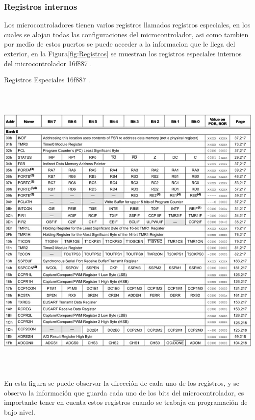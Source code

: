 \documentclass[12pt,a4paper]{article}
\begin{document}
   \subsubsection{Registros internos}
   Los microcontroladores tienen varios registros llamados registros especiales, en los cuales se alojan todas las configuraciones del microcontrolador, asi como tambien por medio de estos puertos se puede acceder a la informacion que le llega del exterior, en la Figura\ref{fig:Registros} se muestran los registros especiales internos del microcontrolador 16f887 \cite{PIC}.
   
   \begin{table}[htpb]
   \centering
   \caption{Registros Especiales 16f887 \cite{PIC}.}
   \includegraphics[height=15cm]{Registros}
   \label{fig:Registros}
   \end{table}
   
   En esta figura se puede observar la dirección de cada uno de los registros, y se observa la información que guarda cada uno de los bits del microcontrolador, es importante tener en cuenta estos registros cuando se trabaja en programación de bajo nivel.
   
\end{document}
